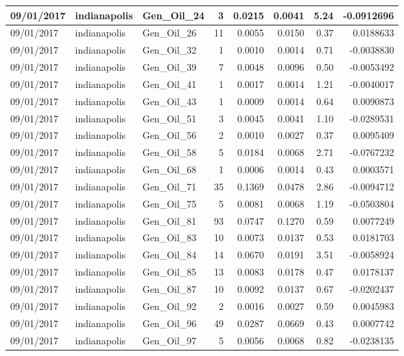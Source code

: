 \documentclass[
  letterpaper,
  DIV=11,
  numbers=noendperiod]{scrartcl}
\begin{document}
\begin{tabular}{l|l|l|r|r|r|r|r}
\hline
09/01/2017 & indianapolis & Gen\_Oil\_24 & 3 & 0.0215 & 0.0041 & 5.24 & -0.0912696\\
\hline
09/01/2017 & indianapolis & Gen\_Oil\_26 & 11 & 0.0055 & 0.0150 & 0.37 & 0.0188633\\
\hline
09/01/2017 & indianapolis & Gen\_Oil\_32 & 1 & 0.0010 & 0.0014 & 0.71 & -0.0038830\\
\hline
09/01/2017 & indianapolis & Gen\_Oil\_39 & 7 & 0.0048 & 0.0096 & 0.50 & -0.0053492\\
\hline
09/01/2017 & indianapolis & Gen\_Oil\_41 & 1 & 0.0017 & 0.0014 & 1.21 & -0.0040017\\
\hline
09/01/2017 & indianapolis & Gen\_Oil\_43 & 1 & 0.0009 & 0.0014 & 0.64 & 0.0090873\\
\hline
09/01/2017 & indianapolis & Gen\_Oil\_51 & 3 & 0.0045 & 0.0041 & 1.10 & -0.0289531\\
\hline
09/01/2017 & indianapolis & Gen\_Oil\_56 & 2 & 0.0010 & 0.0027 & 0.37 & 0.0095409\\
\hline
09/01/2017 & indianapolis & Gen\_Oil\_58 & 5 & 0.0184 & 0.0068 & 2.71 & -0.0767232\\
\hline
09/01/2017 & indianapolis & Gen\_Oil\_68 & 1 & 0.0006 & 0.0014 & 0.43 & 0.0003571\\
\hline
09/01/2017 & indianapolis & Gen\_Oil\_71 & 35 & 0.1369 & 0.0478 & 2.86 & -0.0094712\\
\hline
09/01/2017 & indianapolis & Gen\_Oil\_75 & 5 & 0.0081 & 0.0068 & 1.19 & -0.0503804\\
\hline
09/01/2017 & indianapolis & Gen\_Oil\_81 & 93 & 0.0747 & 0.1270 & 0.59 & 0.0077249\\
\hline
09/01/2017 & indianapolis & Gen\_Oil\_83 & 10 & 0.0073 & 0.0137 & 0.53 & 0.0181703\\
\hline
09/01/2017 & indianapolis & Gen\_Oil\_84 & 14 & 0.0670 & 0.0191 & 3.51 & -0.0058924\\
\hline
09/01/2017 & indianapolis & Gen\_Oil\_85 & 13 & 0.0083 & 0.0178 & 0.47 & 0.0178137\\
\hline
09/01/2017 & indianapolis & Gen\_Oil\_87 & 10 & 0.0092 & 0.0137 & 0.67 & -0.0202437\\
\hline
09/01/2017 & indianapolis & Gen\_Oil\_92 & 2 & 0.0016 & 0.0027 & 0.59 & 0.0045983\\
\hline
09/01/2017 & indianapolis & Gen\_Oil\_96 & 49 & 0.0287 & 0.0669 & 0.43 & 0.0007742\\
\hline
09/01/2017 & indianapolis & Gen\_Oil\_97 & 5 & 0.0056 & 0.0068 & 0.82 & -0.0238135\\

\end{tabular}
\end{document}
